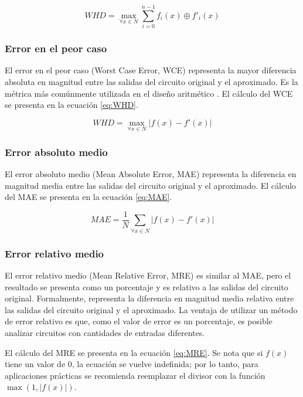 \begin{equation} \label{eq:WHD}
  WHD = \max_{\forall x \in N} \sum_{i=0}^{n-1} f_i(x) \oplus f'_i(x)
\end{equation}

\subsubsection{Error en el peor caso}

El error en el peor caso (Worst Case Error, WCE) representa la mayor diferencia
absoluta en magnitud entre las salidas del circuito original y el aproximado.
Es la métrica más comúnmente utilizada en el diseño aritmético
\cite{ammes_two-level_2022}. El cálculo del WCE se presenta en la ecuación
\ref{eq:WHD}.

\begin{equation} \label{eq:WCE}
  WHD = \max_{\forall x \in N} \left| f(x) - f'(x) \right|
\end{equation}

\subsubsection{Error absoluto medio}

El error absoluto medio (Mean Absolute Error, MAE) representa la diferencia en
magnitud media entre las salidas del circuito original y el aproximado. El 
cálculo del MAE se presenta en la ecuación \ref{eq:MAE}.

\begin{equation} \label{eq:MAE}
  MAE = \frac{1}{N} \sum_{\forall x \in N} \left| f(x) - f'(x) \right|
\end{equation}

\subsubsection{Error relativo medio}

El error relativo medio (Mean Relative Error, MRE) es similar al MAE, pero el
resultado se presenta como un porcentaje y es relativo a las salidas del
circuito original. Formalmente, representa la diferencia en magnitud media
relativa entre las salidas del circuito original y el aproximado. La ventaja de
utilizar un método de error relativo es que, como el valor de error es un
porcentaje, es posible analizar circuitos con cantidades de entradas
diferentes.

El cálculo del MRE se presenta en la ecuación \ref{eq:MRE}. Se nota que si
$f(x)$ tiene un valor de $0$, la ecuación se vuelve indefinida; por lo tanto,
para aplicaciones prácticas se recomienda reemplazar el divisor con la función
$\max \left( 1, \left| f(x) \right| \right)$.


